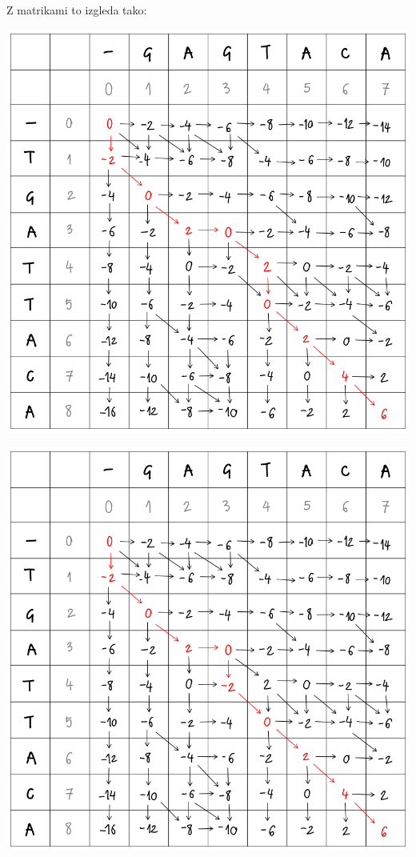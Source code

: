 \documentclass{article}
\begin{document}
\begin{enumerate}
\begin{enumerate}
				Z matrikami to izgleda tako:

				\begin{multicols}{2}
					\includegraphics[scale=0.23]{matrika-complete-2}

					\columnbreak

					\includegraphics[scale=0.23]{matrika-complete-3}
				\end{multicols}
		\end{enumerate}


\end{enumerate}
\end{document}
